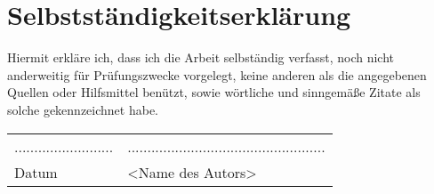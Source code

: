 \chapter*{Selbstständigkeitserklärung}
Hiermit erkläre ich, dass ich die Arbeit selbständig verfasst, noch nicht anderweitig für Prüfungszwecke vorgelegt, keine anderen als die angegebenen Quellen oder Hilfsmittel benützt, sowie wörtliche und sinngemäße Zitate als solche gekennzeichnet habe.

\vspace{2cm}

\begin{tabular}{@{}ll@{}}
......................... &  .................................................. \\
Datum                     &  <Name des Autors>
\end{tabular}
